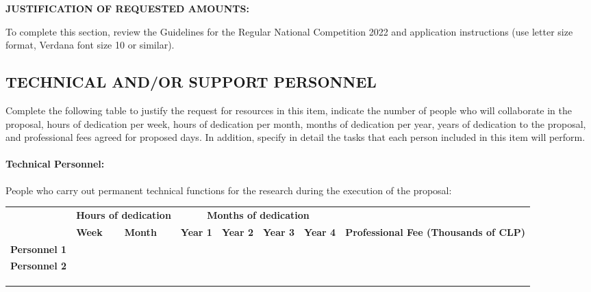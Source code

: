 \documentclass[MAIN.tex]{subfiles}
\begin{document}
\noindent\textbf{JUSTIFICATION OF REQUESTED AMOUNTS:}

\noindent To complete this section, review the Guidelines for the Regular National Competition 2022 and application instructions (use letter size format, Verdana font size 10 or similar).

\subsection*{\uppercase{Technical and/or support personnel}}

Complete the following table to justify the request for resources in this item, indicate the number of people who will collaborate in the proposal, hours of dedication per week, hours of dedication per month, months of dedication per year, years of dedication to the proposal, and professional fees agreed for proposed days.
In addition, specify in detail the tasks that each person included in this item will perform.

\paragraph*{Technical Personnel:} People who carry out permanent technical functions for the research during the execution of the proposal:

\medskip

\noindent\begin{tabularx}{\linewidth}{|m{.26\linewidth}|X|X|X|X|X|X|m{.20\linewidth}|}
\hline
\cellcolor{tcc}
& \multicolumn{2}{c|}{\cellcolor{tcc}\begin{minipage}{.14\linewidth}\centering\textbf{Hours of dedication}\vspace{3pt}\end{minipage}}
& \multicolumn{4}{c|}{\cellcolor{tcc}\textbf{Months of dedication}}
& \cellcolor{tcc}
\tabularnewline
\hhline{|>{\arrayrulecolor{tcc}}->{\arrayrulecolor{black}}|------>{\arrayrulecolor{tcc}}->{\arrayrulecolor{black}}}
\multirow{-2}{*}{\cellcolor{tcc}\textbf{Technical personnel}}
& \cellcolor{tcc}\centering\small\textbf{Week}
& \cellcolor{tcc}\centering\small\textbf{Month}
& \cellcolor{tcc}\centering\small\textbf{Year 1}
& \cellcolor{tcc}\centering\small\textbf{Year 2}
& \cellcolor{tcc}\centering\small\textbf{Year 3}
& \cellcolor{tcc}\centering\small\textbf{Year 4}
& \multirow{-2}{.20\textwidth}{\cellcolor{tcc}\centering\textbf{Professional Fee (Thousands of CLP)}}
\tabularnewline
\hline
\textbf{Personnel 1} & & & & & & & \\\hline
\textbf{Personnel 2} & & & & & & & \\\hline
 & & & & & & & \\\hline
 & & & & & & & \\\hline
 & & & & & & & \\\hline
\end{tabularx}
\end{document}
